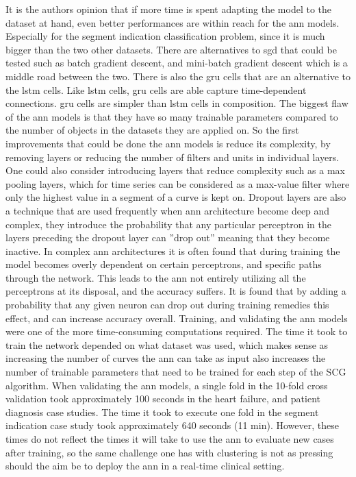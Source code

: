 It is the authors opinion that if more time is spent adapting the model to the dataset at hand, even better performances are within reach for the \acrshort{ann} models. Especially for the segment indication classification problem, since it is much bigger than the two other datasets. There are alternatives to \acrshort{sgd} that could be tested such as batch gradient descent, and mini-batch gradient descent which is a middle road between the two. There is also the \acrfull{gru} cells that are an alternative to the \acrshort{lstm} cells. Like \acrshort{lstm} cells, \acrshort{gru} cells are able capture time-dependent connections. \acrshort{gru} cells are simpler than \acrshort{lstm} cells in composition. The biggest flaw of the \acrshort{ann} models is that they have so many trainable parameters compared to the number of objects in the datasets they are applied on. So the first improvements that could be done the \acrshort{ann} models is reduce its complexity, by removing layers or reducing the number of filters and units in individual layers. One could also consider introducing layers that reduce complexity such as a max pooling layers, which for time series can be considered as a max-value filter where only the highest value in a segment of a curve is kept on. Dropout layers are also a technique that are used frequently when \acrshort{ann} architecture become deep and complex, they introduce the probability that any particular perceptron in the layers preceding the dropout layer can ''drop out'' meaning that they become inactive. In complex \acrshort{ann} architectures it is often found that during training the model becomes overly dependent on certain perceptrons, and specific paths through the network. This leads to the \acrshort{ann} not entirely utilizing all the perceptrons at its disposal, and the accuracy suffers. It is found that by adding a probability that any given neuron can drop out during training remedies this effect, and can increase accuracy overall. \bigskip
Training, and validating the \acrshort{ann} models were one of the more time-consuming computations required. The time it took to train the network depended on what dataset was used, which makes sense as increasing the number of curves the \acrshort{ann} can take as input also increases the number of trainable parameters that need to be trained for each step of the SCG algorithm. When validating the \acrshort{ann} models, a single fold in the 10-fold cross validation took approximately 100 seconds in the heart failure, and patient diagnosis case studies. The time it took to execute one fold in the segment indication case study took approximately 640 seconds (11 min). However, these times do not reflect the times it will take to use the \acrshort{ann} to evaluate new cases after training, so the same challenge one has with clustering is not as pressing should the aim be to deploy the \acrshort{ann} in a real-time clinical setting.

